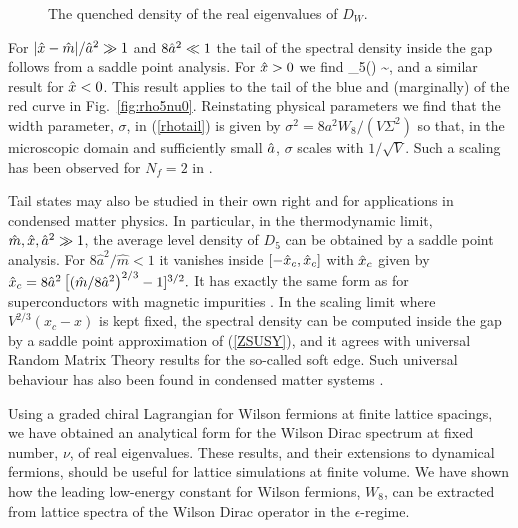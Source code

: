\documentclass[aps,prl,twocolumn,superscriptaddress,preprintnumbers,floatfix,nofootinbib]{revtex4}
\begin{document}
\begin{figure}[t!]
  \caption{ \label{fig:rho-topo} The quenched density of the 
real eigenvalues of $D_W$.}
\end{figure}

 For $|\hat{x}-\hat{m}|/\hat{a}^2\gg 1$ 
and $8\hat{a}^2 \ll 1$ the tail of the spectral density inside the gap
follows from a saddle point analysis. For $\hat{x}>0$ we find
\be
\rho_5(\hx) \sim \exp[{-{(\hx-\hm)^2}/{16\ha^2}}],\label{rhotail}
\ee
and a similar result for $\hat{x} < 0$.
This result applies to the tail of the blue and (marginally) of the
red curve in Fig.~\ref{fig:rho5nu0}. 
Reinstating physical parameters we find that the width 
 parameter, $\sigma$, in (\ref{rhotail}) is given by
$
\sigma^2 = {8a^2 W_8}/({V \Sigma^2})
$
so that, in the microscopic domain and sufficiently small $\hat{a}$,
$\sigma$ scales with $1/\sqrt{V}$. Such a scaling 
has been observed for $N_f=2$ in \cite{Luscher,DelDebbio}.

Tail states may also be studied in their own right and for
applications in condensed matter physics. In particular,
in the thermodynamic limit, $\hat{m}, \hat{x}, \hat{a}^2 \gg 1$,
the average level density of $D_5$ can be obtained by a saddle point
analysis. For $8\hat a^2/\hat m < 1$ it
 vanishes inside $[-\hat{x}_c, \hat{x}_c]$ with $\hat{x}_c$ given by
$
\hat{x}_c = 8 \hat a^2\left [ ( \hat m/{8\hat a^2}\right)^{2/3}
-1]^{3/2}.
$  
It has exactly the same form as for superconductors with
magnetic impurities \cite{Simons}. 
In the scaling limit where $V^{2/3} (x_c -x)$ is kept fixed,
the spectral density can be computed inside the gap by a saddle
point approximation of (\ref{ZSUSY}), and it agrees with
universal Random Matrix Theory results for the so-called soft edge.
Such universal behaviour has also been found in condensed matter
systems \cite{Simons,beenrev}. 

 Using a graded 
chiral Lagrangian for Wilson fermions at finite lattice spacings, we 
have obtained an analytical form for 
the Wilson Dirac spectrum at fixed number, $\nu$, of real
eigenvalues. These
results, and their extensions to dynamical fermions, 
should be useful for lattice simulations at finite volume. 
We have shown how the leading low-energy constant for Wilson fermions,
$W_8$, can be extracted from lattice spectra of the
Wilson Dirac operator in the  $\epsilon$-regime. 
\end{document}
